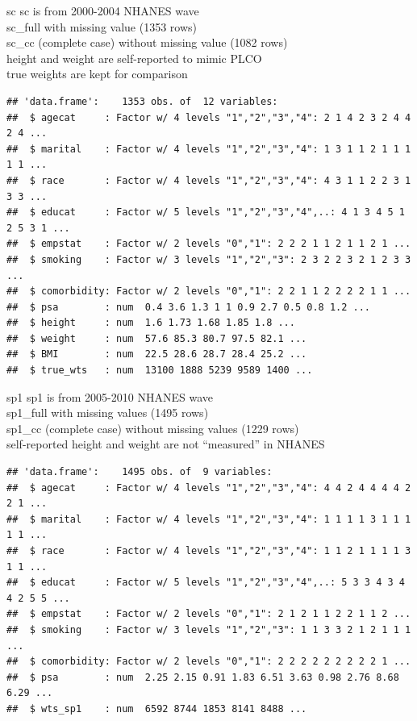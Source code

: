\documentclass[
  ignorenonframetext,
]{beamer}
\begin{document}
\begin{frame}[fragile]{sc}
\label{sc}
sc is from 2000-2004 NHANES wave\\
sc\_full with missing value (1353 rows)\\
sc\_cc (complete case) without missing value (1082 rows)\\
height and weight are self-reported to mimic PLCO\\
true weights are kept for comparison

\begin{verbatim}
## 'data.frame':    1353 obs. of  12 variables:
##  $ agecat     : Factor w/ 4 levels "1","2","3","4": 2 1 4 2 3 2 4 4 2 4 ...
##  $ marital    : Factor w/ 4 levels "1","2","3","4": 1 3 1 1 2 1 1 1 1 1 ...
##  $ race       : Factor w/ 4 levels "1","2","3","4": 4 3 1 1 2 2 3 1 3 3 ...
##  $ educat     : Factor w/ 5 levels "1","2","3","4",..: 4 1 3 4 5 1 2 5 3 1 ...
##  $ empstat    : Factor w/ 2 levels "0","1": 2 2 2 1 1 2 1 1 2 1 ...
##  $ smoking    : Factor w/ 3 levels "1","2","3": 2 3 2 2 3 2 1 2 3 3 ...
##  $ comorbidity: Factor w/ 2 levels "0","1": 2 2 1 1 2 2 2 2 1 1 ...
##  $ psa        : num  0.4 3.6 1.3 1 1 0.9 2.7 0.5 0.8 1.2 ...
##  $ height     : num  1.6 1.73 1.68 1.85 1.8 ...
##  $ weight     : num  57.6 85.3 80.7 97.5 82.1 ...
##  $ BMI        : num  22.5 28.6 28.7 28.4 25.2 ...
##  $ true_wts   : num  13100 1888 5239 9589 1400 ...
\end{verbatim}
\end{frame}

\begin{frame}[fragile]{sp1}
\label{sp1}
sp1 is from 2005-2010 NHANES wave\\
sp1\_full with missing values (1495 rows)\\
sp1\_cc (complete case) without missing values (1229 rows)\\
self-reported height and weight are not ``measured'' in NHANES

\begin{verbatim}
## 'data.frame':    1495 obs. of  9 variables:
##  $ agecat     : Factor w/ 4 levels "1","2","3","4": 4 4 2 4 4 4 4 2 2 1 ...
##  $ marital    : Factor w/ 4 levels "1","2","3","4": 1 1 1 1 3 1 1 1 1 1 ...
##  $ race       : Factor w/ 4 levels "1","2","3","4": 1 1 2 1 1 1 1 3 1 1 ...
##  $ educat     : Factor w/ 5 levels "1","2","3","4",..: 5 3 3 4 3 4 4 2 5 5 ...
##  $ empstat    : Factor w/ 2 levels "0","1": 2 1 2 1 1 2 2 1 1 2 ...
##  $ smoking    : Factor w/ 3 levels "1","2","3": 1 1 3 3 2 1 2 1 1 1 ...
##  $ comorbidity: Factor w/ 2 levels "0","1": 2 2 2 2 2 2 2 2 2 1 ...
##  $ psa        : num  2.25 2.15 0.91 1.83 6.51 3.63 0.98 2.76 8.68 6.29 ...
##  $ wts_sp1    : num  6592 8744 1853 8141 8488 ...
\end{verbatim}
\end{frame}
\end{document}
